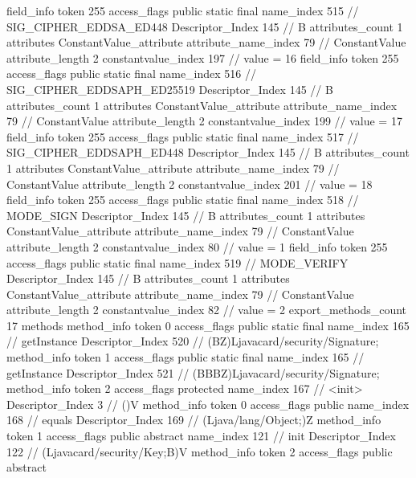 {{{{			field_info {
				token	255
				access_flags	public static final
				name_index	515		// SIG_CIPHER_EDDSA_ED448
				Descriptor_Index	145		// B
				attributes_count	1
				attributes {
				ConstantValue_attribute {
					attribute_name_index	79		// ConstantValue
					attribute_length	2
					constantvalue_index	197		// value = 16
				}
				}
			}
			field_info {
				token	255
				access_flags	public static final
				name_index	516		// SIG_CIPHER_EDDSAPH_ED25519
				Descriptor_Index	145		// B
				attributes_count	1
				attributes {
				ConstantValue_attribute {
					attribute_name_index	79		// ConstantValue
					attribute_length	2
					constantvalue_index	199		// value = 17
				}
				}
			}
			field_info {
				token	255
				access_flags	public static final
				name_index	517		// SIG_CIPHER_EDDSAPH_ED448
				Descriptor_Index	145		// B
				attributes_count	1
				attributes {
				ConstantValue_attribute {
					attribute_name_index	79		// ConstantValue
					attribute_length	2
					constantvalue_index	201		// value = 18
				}
				}
			}
			field_info {
				token	255
				access_flags	public static final
				name_index	518		// MODE_SIGN
				Descriptor_Index	145		// B
				attributes_count	1
				attributes {
				ConstantValue_attribute {
					attribute_name_index	79		// ConstantValue
					attribute_length	2
					constantvalue_index	80		// value = 1
				}
				}
			}
			field_info {
				token	255
				access_flags	public static final
				name_index	519		// MODE_VERIFY
				Descriptor_Index	145		// B
				attributes_count	1
				attributes {
				ConstantValue_attribute {
					attribute_name_index	79		// ConstantValue
					attribute_length	2
					constantvalue_index	82		// value = 2
				}
				}
			}
			}
			export_methods_count	17
			methods {
				method_info {
					token	0
					access_flags	public static final
					name_index	165		// getInstance
					Descriptor_Index	520		// (BZ)Ljavacard/security/Signature;
				}
				method_info {
					token	1
					access_flags	public static final
					name_index	165		// getInstance
					Descriptor_Index	521		// (BBBZ)Ljavacard/security/Signature;
				}
				method_info {
					token	2
					access_flags	protected
					name_index	167		// <init>
					Descriptor_Index	3		// ()V
				}
				method_info {
					token	0
					access_flags	public
					name_index	168		// equals
					Descriptor_Index	169		// (Ljava/lang/Object;)Z
				}
				method_info {
					token	1
					access_flags	public abstract
					name_index	121		// init
					Descriptor_Index	122		// (Ljavacard/security/Key;B)V
				}
				method_info {
					token	2
					access_flags	public abstract
}}}}}
